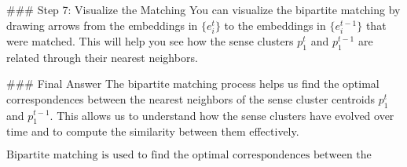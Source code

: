 ### Step 7: Visualize the Matching
You can visualize the bipartite matching by drawing arrows from the embeddings in \( \{e_i^t\} \) to the embeddings in \( \{e_i^{t-1}\} \) that were matched. This will help you see how the sense clusters \( p_1^t \) and \( p_1^{t-1} \) are related through their nearest neighbors.

### Final Answer
The bipartite matching process helps us find the optimal correspondences between the nearest neighbors of the sense cluster centroids \( p_1^t \) and \( p_1^{t-1} \). This allows us to understand how the sense clusters have evolved over time and to compute the similarity between them effectively.

\[
\boxed{\text{Bipartite matching is used to find the optimal correspondences between the nearest neighbors of the sense cluster centroids.}}
\]